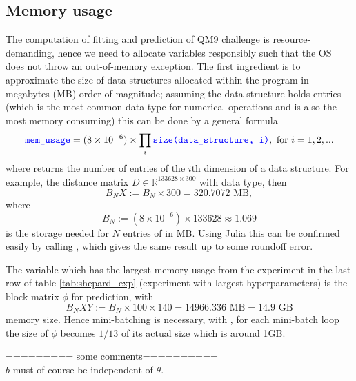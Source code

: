 \documentclass[12pt]{article}
\begin{document}
\subsection{Memory usage}
The computation of fitting and prediction of QM9 challenge is resource-demanding, hence we need to allocate variables responsibly such that the OS does not throw an out-of-memory exception. The first ingredient is to approximate the size of data structures allocated within the program in megabytes (MB) order of magnitude; assuming the data structure holds  entries (which is the most common data type for numerical operations and is also the most memory consuming) this can be done by a general formula
\begin{equation}
	\codeword{mem_usage} = (8\times 10^{-6}) \times \prod_{i}\codeword{size(data_structure, i)}, \text{ for } i = 1,2,...
\end{equation}
where  returns the number of entries of the $i$th dimension of a data structure. For example, the distance matrix $D \in \mathbb{R}^{133628 \times 300}$ with  data type, then
\begin{equation}
	B_NX := B_N \times 300 = 320.7072 \text{ MB},
\end{equation}
where
\begin{equation}
	B_N := (8\times 10^{-6}) \times 133628 \approx 1.069
\end{equation}
is the storage needed for $N$ entries of  in MB.
Using Julia this can be confirmed easily by calling , which gives the same result up to some roundoff error.

The variable which has the largest memory usage from the experiment in the last row of table \ref{tab:shepard_exp} (experiment with largest hyperparameters)  is the block matrix $\phi$  for prediction, with
\begin{equation}
	B_NXY := B_N \times 100 \times 140 = 14966.336 \text{ MB} = 14.9 \text{ GB}
\end{equation}
memory size. Hence mini-batching is necessary, with , for each mini-batch loop the size of $\phi$ becomes $1/13$ of its actual size which is around 1GB. 


\iffalse
========= some comments========== \\
$b$ must of course be independent of $\theta$.
\end{document}
